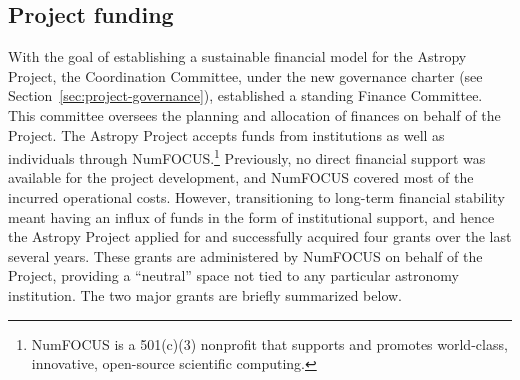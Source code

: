 \documentclass[modern]{aastex631}
\newcommand{\secauthor}[1]{{\color{blue}Author:~\textit{#1}}}
\begin{document}


\subsection{Project funding} \label{sec:project-funding}



With the goal of establishing a sustainable financial model for the Astropy
Project, the Coordination Committee, under the new governance charter (see
Section~\ref{sec:project-governance}), established a standing Finance Committee.
This committee oversees the planning and allocation of finances on behalf
of the Project. The Astropy Project accepts funds from institutions as well as
individuals through NumFOCUS.\footnote{NumFOCUS is a 501(c)(3) nonprofit that
supports and promotes world-class, innovative, open-source scientific computing.}
Previously, no direct financial support was available for the project development,
and NumFOCUS covered most of the incurred operational costs. However, transitioning
to long-term financial stability meant having an influx of funds in the form of
institutional support, and hence the Astropy Project applied for and successfully
acquired four grants over the last several years. These grants are administered by NumFOCUS on behalf of the
Project, providing a ``neutral'' space not tied to any particular astronomy
institution. The two major grants are briefly summarized below.
\end{document}
